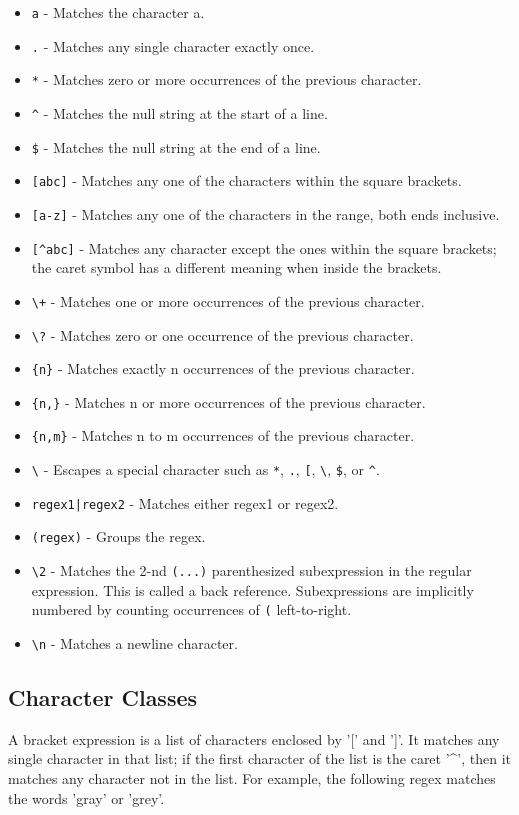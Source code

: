 \begin{itemize}
  \item \lstinline|a| - Matches the character a.
  \item \lstinline|.| - Matches any single character exactly once.
  \item \lstinline|*| - Matches zero or more occurrences of the previous character.
  \item \lstinline|^| - Matches the null string at the start of a line.
  \item \lstinline|$| - Matches the null string at the end of a line.
  \item \lstinline|[abc]| - Matches any one of the characters within the square brackets.
  \item \lstinline|[a-z]| - Matches any one of the characters in the range, both ends inclusive.
  \item \lstinline|[^abc]| - Matches any character except the ones within the square brackets; the caret symbol has a different meaning when inside the brackets.
  \item \lstinline|\+| - Matches one or more occurrences of the previous character.
  \item \lstinline|\?| - Matches zero or one occurrence of the previous character.
  \item \lstinline|{n}| - Matches exactly n occurrences of the previous character.
  \item \lstinline|{n,}| - Matches n or more occurrences of the previous character.
  \item \lstinline|{n,m}| - Matches n to m occurrences of the previous character.
  \item \lstinline|\| - Escapes a special character such as \lstinline|*|, \lstinline|.|, \lstinline|[|, \lstinline|\|, \lstinline|$|, or \lstinline|^|.
  \item \lstinline/regex1|regex2/ - Matches either regex1 or regex2.
  \item \lstinline|(regex)| - Groups the regex.
    \item \lstinline|\2| - Matches the 2-nd \lstinline|(...)| parenthesized subexpression in the regular expression. This is called a back reference. Subexpressions are implicitly numbered by counting occurrences of \lstinline|(| left-to-right.
  \item \lstinline|\n| - Matches a newline character.
\end{itemize}

\subsection{Character Classes}
A bracket expression is a list of characters enclosed by '[' and ']'. It matches any single character in that list; if the first character of the list is the caret '\textasciicircum', then it matches any character not in the list.
For example, the following regex matches the words 'gray' or 'grey'.

